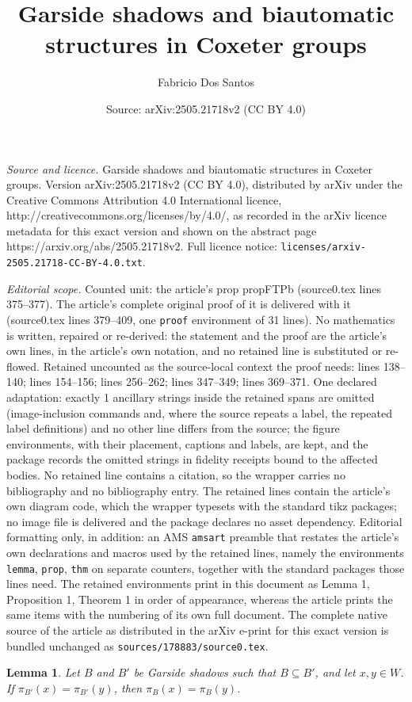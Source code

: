 \documentclass[10pt,a4paper]{amsart}
\title{Garside shadows and biautomatic structures in Coxeter groups}
\author{Fabricio Dos Santos}
\date{Source: arXiv:2505.21718v2 (CC BY 4.0)}
\newtheorem{lemma}{Lemma}
\begin{document}
\maketitle

\noindent\emph{Source and licence.} Garside shadows and biautomatic structures in Coxeter groups. Version arXiv:2505.21718v2 (CC BY 4.0), distributed by arXiv under the Creative Commons Attribution 4.0 International licence, http://creativecommons.org/licenses/by/4.0/, as recorded in the arXiv licence metadata for this exact version and shown on the abstract page https://arxiv.org/abs/2505.21718v2. Full licence notice: \texttt{licenses/arxiv-2505.21718-CC-BY-4.0.txt}.\par\smallskip

\noindent\textit{Editorial scope.} Counted unit: the article's prop propFTPb (source0.tex lines 375--377). The article's complete original proof of it is delivered with it (source0.tex lines 379--409, one \texttt{proof} environment of 31 lines). No mathematics is written, repaired or re-derived: the statement and the proof are the article's own lines, in the article's own notation, and no retained line is substituted or re-flowed.  Retained uncounted as the source-local context the proof needs: lines 138--140; lines 154--156; lines 256--262; lines 347--349; lines 369--371.  One declared adaptation: exactly 1 ancillary strings inside the retained spans are omitted (image-inclusion commands and, where the source repeats a label, the repeated label definitions) and no other line differs from the source; the figure environments, with their placement, captions and labels, are kept, and the package records the omitted strings in fidelity receipts bound to the affected bodies.  No retained line contains a citation, so the wrapper carries no bibliography and no bibliography entry.  The retained lines contain the article's own diagram code, which the wrapper typesets with the standard tikz packages; no image file is delivered and the package declares no asset dependency.  Editorial formatting only, in addition: an AMS \texttt{amsart} preamble that restates the article's own declarations and macros used by the retained lines, namely the environments \texttt{lemma}, \texttt{prop}, \texttt{thm} on separate counters, together with the standard packages those lines need.  The retained environments print in this document as Lemma 1, Proposition 1, Theorem 1 in order of appearance, whereas the article prints the same items with the numbering of its own full document.  The complete native source of the article as distributed in the arXiv e-print for this exact version is bundled unchanged as \texttt{sources/178883/source0.tex}.
\begin{lemma} \label{refinement}
    Let $B$ and $B'$ be Garside shadows such that $B \subseteq B'$, and let $x,y \in W$. If $\pi_{B'}(x) = \pi_{B'}(y)$, then $\pi_B(x) = \pi_B(y)$. 
\end{lemma}
\end{document}
